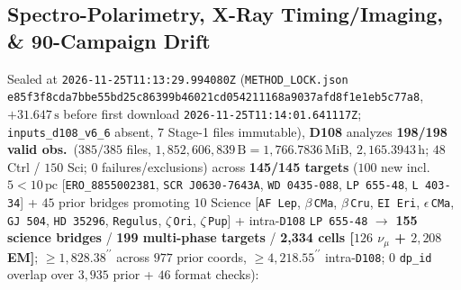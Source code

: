 \documentclass[twocolumn,10pt]{article}
\begin{document}
\subsection{Spectro-Polarimetry, X-Ray Timing/Imaging, \& 90-Campaign Drift}
Sealed at \texttt{2026-11-25T11:13:29.994080Z} (\texttt{METHOD\_LOCK.json} \texttt{e85f3f8c\allowbreak da7bbe55\allowbreak bd25c863\allowbreak 99b46021\allowbreak cd054211\allowbreak 168a9037\allowbreak afd8f1e1\allowbreak eb5c77a8}, $+31.647\,\text{s}$ before first download \texttt{2026-11-25T11:14:01.641117Z}; \texttt{inputs\_d108\_v6\_6} absent, 7 Stage-1 files immutable), \textbf{D108} analyzes \textbf{198/198 valid obs.}\ ($385/385$ files, $1{,}852{,}606{,}839\,\text{B} = 1{,}766.7836\,\text{MiB}$, $2{,}165.3943\,\text{h}$; $48$ Ctrl / $150$ Sci; $0$ failures/exclusions) across \textbf{145/145 targets} ($100$ new incl.\ $5 < 10\,\text{pc}$ [\texttt{ERO\_8855002381}, \texttt{SCR\,J0630-7643A}, \texttt{WD\,0435-088}, \texttt{LP\,655-48}, \texttt{L\,403-34}] + $45$ prior bridges promoting $10$ Science [\texttt{AF\,Lep}, $\beta$\,\texttt{CMa}, $\beta$\,\texttt{Cru}, \texttt{EI\,Eri}, $\epsilon$\,\texttt{CMa}, \texttt{GJ\,504}, \texttt{HD\,35296}, \texttt{Regulus}, $\zeta$\,\texttt{Ori}, $\zeta$\,\texttt{Pup}] + intra-\texttt{D108} \texttt{LP\,655-48} $\rightarrow$ \textbf{155 science bridges} / \textbf{199 multi-phase targets} / \textbf{2,334 cells [$126$ $\nu_\mu$ + $2{,}208$ EM]}; $\ge 1{,}828.38^{\prime\prime}$ across $977$ prior coords, $\ge 4{,}218.55^{\prime\prime}$ intra-\texttt{D108}; $0$ \texttt{dp\_id} overlap over $3{,}935$ prior + $46$ format checks):
\end{document}
